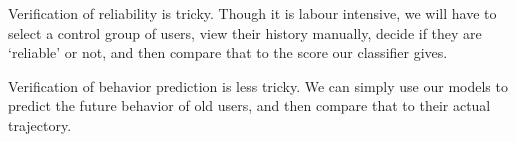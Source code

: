 Verification of reliability is tricky. Though it is labour intensive, we will
have to select a control group of users, view their history manually, decide if
they are `reliable' or not, and then compare that to the score our classifier
gives.

Verification of behavior prediction is less tricky. We can simply use our models
to predict the future behavior of old users, and then compare that to their
actual trajectory.


